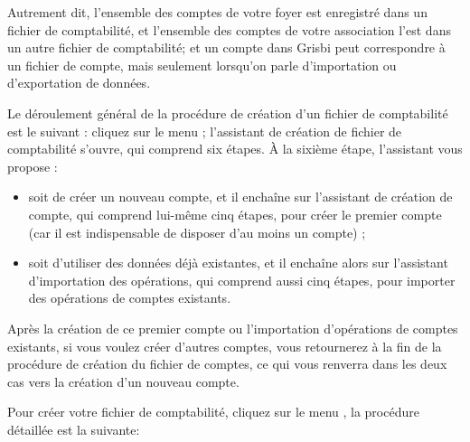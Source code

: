 Autrement dit, l'ensemble des comptes de votre foyer est enregistré dans un fichier de comptabilité, et l'ensemble des comptes de votre association l'est dans un autre fichier de comptabilité; et un compte dans Grisbi peut correspondre à un fichier de compte, mais seulement lorsqu'on parle d'importation ou d'exportation de données.

Le déroulement général de la procédure de création d'un fichier de comptabilité est le suivant : cliquez sur le menu  ; l'assistant de création de fichier de comptabilité s'ouvre, qui comprend six étapes. À la sixième étape, l'assistant vous propose :

\begin{itemize}
	\item  soit de créer un nouveau compte, et il enchaîne sur l'assistant de création de compte, qui comprend lui-même cinq étapes, pour créer le premier compte (car il est indispensable de disposer d'au moins un compte) ;
	\item soit d'utiliser des données déjà existantes, et il enchaîne alors sur l'assistant d'importation des opérations, qui comprend aussi cinq étapes, pour importer des opérations de comptes existants.
\end{itemize}

Après la création de ce premier compte ou l'importation d'opérations de comptes existants, si vous voulez créer d'autres comptes, vous retournerez à la fin de la procédure de création du fichier de comptes, ce qui vous renverra dans les deux cas vers la création d'un nouveau compte.

Pour créer votre fichier de comptabilité, cliquez sur le menu , la procédure détaillée est la suivante:

